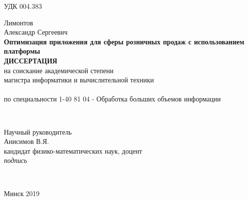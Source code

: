 \begin{titlepage}
\begin{center}
  \end{center}

УДК 004.383\\[2em]

  \begin{center}
    Лимонтов\\
    Александр Сергеевич
    \\[1em]
    \textbf{Оптимизация приложения для сферы розничных продаж с использованием платформы \LB}\\[3em]
    \textbf{\large\MakeUppercase{Диссертация}}\\
    на соискание академической степени\\магистра информатики и вычислительной техники\\
    \\[1em]
    по специальности 1-40 81 04 - Обработка больших объемов информации
  \end{center}\\[2em]

  \begin{flushright}
    \begin{minipage}{0.42\textwidth}
      Научный руководитель\\
      Анисимов В.Я.\\
      кандидат физико-ма\-те\-ма\-ти\-чес\-ких наук, доцент\\[1em]
      \textit{подпись}
    \end{minipage}\\[2.2em]
  \end{flushright}

  \mbox{}
  \vfill
  \begin{center}Минск 2019\end{center}
\end{titlepage}
